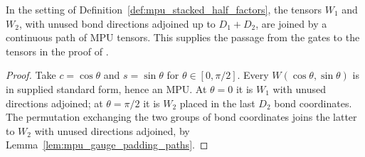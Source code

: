 \begin{lemma}
    \label{lem:mpu_standard_form_interpolation}
    \leanok
    In the setting of Definition~\ref{def:mpu_stacked_half_factors}, the
    tensors $W_1$ and $W_2$, with unused bond directions adjoined up to
    $D_1+D_2$, are joined by a continuous path of MPU tensors. This supplies
    the passage from the gates to the tensors in the proof of
    \cite[Theorem~IV.6(iv)]{Cirac2017MPU}.
\end{lemma}
\begin{proof}
    \leanok
    Take $c=\cos\theta$ and $s=\sin\theta$ for $\theta\in[0,\pi/2]$. Every
    $W(\cos\theta,\sin\theta)$ is in supplied standard form, hence an MPU. At
    $\theta=0$ it is $W_1$ with unused directions adjoined; at
    $\theta=\pi/2$ it is $W_2$ placed in the last $D_2$ bond coordinates.
    The permutation exchanging the two groups of bond coordinates joins the
    latter to $W_2$ with unused directions adjoined, by
    Lemma~\ref{lem:mpu_gauge_padding_paths}.
\end{proof}


